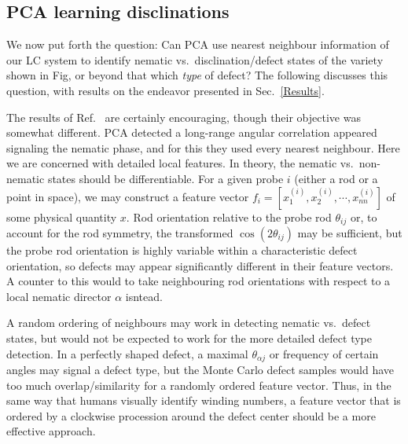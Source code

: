\subsection{PCA learning disclinations}
We now put forth the question: Can PCA use nearest neighbour information of our LC system to identify nematic vs.\ disclination/defect states of the variety shown in Fig, or beyond that which \textit{type} of defect?
The following discusses this question, with results on the endeavor presented in Sec.\ \ref{Results}.

The results of Ref.\ \cite{jadrich2018offlattice} are certainly encouraging, though their objective was somewhat different. PCA detected a long-range angular correlation appeared signaling the nematic phase, and for this they used every  nearest neighbour. Here we are concerned with detailed local features. In theory, the nematic vs.\ non-nematic states should be differentiable. For a given probe $i$ (either a rod or a point in space), we may construct a feature vector $f_i = [x_1^{(i)},x_2^{(i)},\cdots,x_{nn}^{(i)}]$ of some physical quantity $x$. Rod orientation relative to the probe rod $\theta_{ij}$ or, to account for the rod symmetry, the transformed $\cos(2\theta_{ij})$ may be sufficient, but the probe rod orientation is highly variable within a characteristic defect orientation, so defects may appear significantly different in their feature vectors. A counter to this would to take neighbouring rod orientations with respect to a local nematic director $\alpha$ isntead. 

A random ordering of neighbours may work in detecting nematic vs.\ defect states, but would not be expected to work for the more detailed defect type detection. In a perfectly shaped defect, a maximal $\theta_{\alpha j}$ or frequency of certain angles may signal a defect type, but the Monte Carlo defect samples would have too much overlap/similarity for a randomly ordered feature vector. Thus, in the same way that humans visually identify winding numbers, a feature vector that is ordered by a clockwise procession around the defect center should be a more effective approach.



